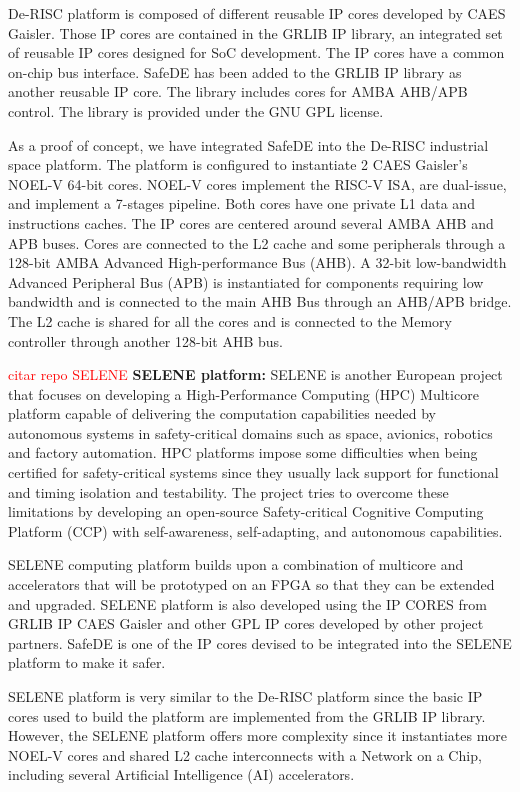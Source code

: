 De-RISC platform is composed of different reusable IP cores developed by CAES Gaisler. Those IP cores are contained in the GRLIB IP library, an integrated set of reusable IP cores designed for SoC development. The IP cores have a common on-chip bus interface. SafeDE has been added to the GRLIB IP library as another reusable IP core. The library includes cores for AMBA AHB/APB control. The library is provided under the GNU GPL license.

As a proof of concept, we have integrated SafeDE into the De-RISC industrial space platform. The platform is configured to instantiate 2 CAES Gaisler's NOEL-V 64-bit cores. NOEL-V cores implement the RISC-V ISA, are dual-issue, and implement a 7-stages pipeline. Both cores have one private L1 data and instructions caches. The IP cores are centered around several AMBA AHB and APB buses. Cores are connected to the L2 cache and some peripherals through a 128-bit AMBA Advanced High-performance Bus (AHB). A 32-bit low-bandwidth Advanced Peripheral Bus (APB) is instantiated for components requiring low bandwidth and is connected to the main AHB Bus through an AHB/APB bridge. The L2 cache is shared for all the cores and is connected to the Memory controller through another 128-bit AHB bus.


\textcolor{red}{citar repo SELENE}
\textbf{SELENE platform:} SELENE \cite{SELENEgit} is another European project that focuses on developing a High-Performance Computing (HPC) Multicore platform capable of delivering the computation capabilities needed by autonomous systems in safety-critical domains such as space, avionics, robotics and factory automation. HPC platforms impose some difficulties when being certified for safety-critical systems since they usually lack support for functional and timing isolation and testability. The project tries to overcome these limitations by developing an open-source Safety-critical Cognitive Computing Platform (CCP) with self-awareness, self-adapting, and autonomous capabilities. 

SELENE computing platform builds upon a combination of multicore and accelerators that will be prototyped on an FPGA so that they can be extended and upgraded. SELENE platform is also developed using the IP CORES from GRLIB IP CAES Gaisler and other GPL IP cores developed by other project partners. SafeDE is one of the IP cores devised to be integrated into the SELENE platform to make it safer.

SELENE platform is very similar to the De-RISC platform since the basic IP cores used to build the platform are implemented from the GRLIB IP library. However, the SELENE platform offers more complexity since it instantiates more NOEL-V cores and shared L2 cache interconnects with a Network on a Chip, including several Artificial Intelligence (AI) accelerators.

